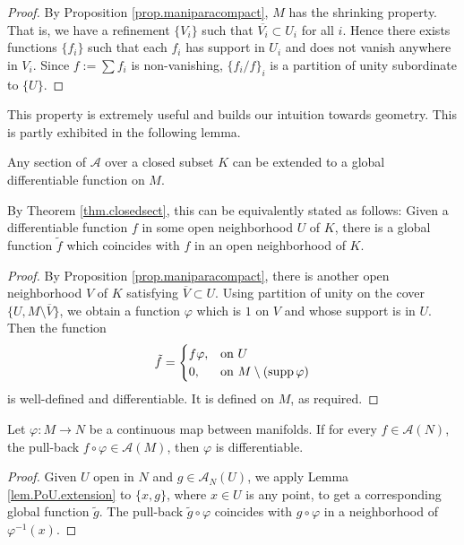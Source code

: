 \begin{proof}
    By Proposition \ref{prop.maniparacompact}, $M$ has the shrinking property. That is, we have a refinement $\{V_i\}$ such that $\overline{V_i}\subset U_i$ for all $i$. Hence there exists functions $\{f_i\}$ such that each $f_i$ has support in $U_i$ and does not vanish anywhere in $V_i$. Since $f:=\sum f_i$ is non-vanishing, $\{f_i/f\}_i$ is a partition of unity subordinate to $\{U\}$.
\end{proof}

This property is extremely useful and builds our intuition towards geometry. This is partly exhibited in the following lemma.

\begin{lemma}\label{lem.PoU.extension}
    Any section of $\mathcal{A}$ over a closed subset $K$ can be extended to a global differentiable function on $M$.

    By Theorem \ref{thm.closedsect}, this can be equivalently stated as follows: Given a differentiable function $f$ in some open neighborhood $U$ of $K$, there is a global function $\tilde f$ which coincides with $f$ in an open neighborhood of $K$.
\end{lemma}

\begin{proof}
    By Proposition \ref{prop.maniparacompact}, there is another open neighborhood $V$ of $K$ satisfying $\overline{V}\subset U$. Using partition of unity on the cover $\{U,M\setminus\overline{V}\}$, we obtain a function $\varphi$ which is $1$ on $V$ and whose support is in $U$. Then the function
    $$\tilde f=\begin{cases}
        f\varphi, & \text{on }U \\
        0, & \text{on }M\setminus(\operatorname{supp}\varphi)
    \end{cases}$$
    is well-defined and differentiable. It is defined on $M$, as required.
\end{proof}

\begin{proposition}
    Let $\varphi:M\to N$ be a continuous map between manifolds. If for every $f\in\mathcal{A}(N)$, the pull-back $f\circ\varphi\in\mathcal{A}(M)$, then $\varphi$ is differentiable.
\end{proposition}

\begin{proof}
    Given $U$ open in $N$ and $g\in\mathcal{A}_N(U)$, we apply Lemma \ref{lem.PoU.extension} to $\{x,g\}$, where $x\in U$ is any point, to get a corresponding global function $\tilde g$. The pull-back $\tilde g\circ\varphi$ coincides with $g\circ\varphi$ in a neighborhood of $\varphi^{-1}(x)$.
\end{proof}

